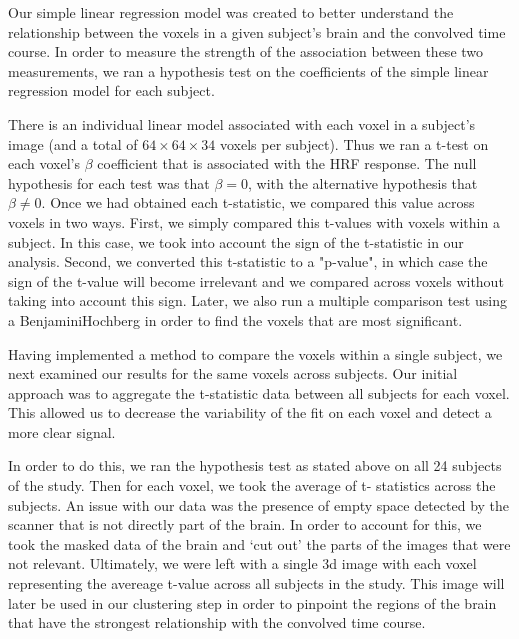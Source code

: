 \par \indent Our simple linear regression model was created to better
understand the relationship between the voxels in a given subject's brain and
the convolved time course. In order to measure the strength of the association
between these two measurements, we ran a hypothesis test on the coefficients of
the simple linear regression model for each subject.

\par There is an individual linear model associated with each voxel in a
subject’s image (and a total of $64 \times 64 \times 34$ voxels per subject).
Thus we ran a t-test on each voxel's $\beta$ coefficient that is associated
with the HRF response. The null hypothesis for each test was that $ \beta = 0$,
with the alternative hypothesis that $\beta \neq 0$. Once we had obtained each
t-statistic, we compared this value across voxels in two ways. First, we simply
compared this t-values with voxels within a subject. In this case, we took into
account the sign of the t-statistic in our analysis. Second, we converted this
t-statistic to a "p-value", in which case the sign of the t-value will become
irrelevant and we compared across voxels without taking into account this sign.
Later, we also run a multiple comparison test using a Benjamini\–Hochberg in
order to find the voxels that are most significant.

\par Having implemented a method to compare the voxels within a single subject,
we next examined our results for the same voxels across subjects. Our initial
approach was to aggregate the t-statistic data between all subjects for each
voxel. This allowed us to decrease the variability of the fit on each voxel and
detect a more clear signal.

\par In order to do this, we ran the hypothesis test as stated above on all 24
subjects of the study. Then for each voxel, we took the average of t-
statistics across the subjects. An issue with our data was the presence of
empty space detected by the scanner that is not directly part of the brain. In
order to account for this, we took the masked data of the brain and ‘cut out’
the parts of the images that were not relevant. Ultimately, we were left with a
single 3d image with each voxel representing the avereage t-value across all
subjects in the study. This image will later be used in our clustering step in
order to pinpoint the regions of the brain that have the strongest relationship
with the convolved time course.
